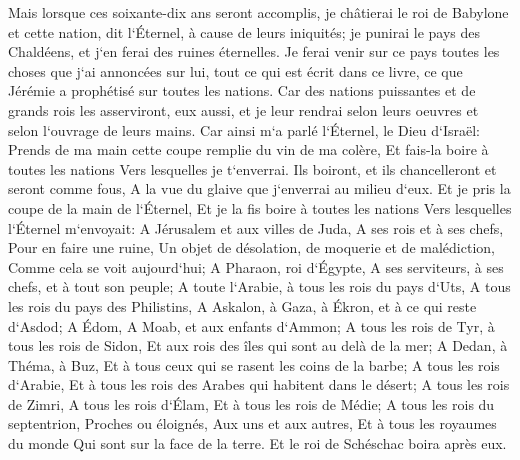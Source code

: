 \verse Mais lorsque ces soixante-dix ans seront accomplis, je châtierai le roi de Babylone et cette nation, dit l`Éternel, à cause de leurs iniquités; je punirai le pays des Chaldéens, et j`en ferai des ruines éternelles. 
\verse Je ferai venir sur ce pays toutes les choses que j`ai annoncées sur lui, tout ce qui est écrit dans ce livre, ce que Jérémie a prophétisé sur toutes les nations. 
\verse Car des nations puissantes et de grands rois les asserviront, eux aussi, et je leur rendrai selon leurs oeuvres et selon l`ouvrage de leurs mains. 
\verse Car ainsi m`a parlé l`Éternel, le Dieu d`Israël: Prends de ma main cette coupe remplie du vin de ma colère, Et fais-la boire à toutes les nations Vers lesquelles je t`enverrai. 
\verse Ils boiront, et ils chancelleront et seront comme fous, A la vue du glaive que j`enverrai au milieu d`eux. 
\verse Et je pris la coupe de la main de l`Éternel, Et je la fis boire à toutes les nations Vers lesquelles l`Éternel m`envoyait: 
\verse A Jérusalem et aux villes de Juda, A ses rois et à ses chefs, Pour en faire une ruine, Un objet de désolation, de moquerie et de malédiction, Comme cela se voit aujourd`hui; 
\verse A Pharaon, roi d`Égypte, A ses serviteurs, à ses chefs, et à tout son peuple; 
\verse A toute l`Arabie, à tous les rois du pays d`Uts, A tous les rois du pays des Philistins, A Askalon, à Gaza, à Ékron, et à ce qui reste d`Asdod; 
\verse A Édom, A Moab, et aux enfants d`Ammon; 
\verse A tous les rois de Tyr, à tous les rois de Sidon, Et aux rois des îles qui sont au delà de la mer; 
\verse A Dedan, à Théma, à Buz, Et à tous ceux qui se rasent les coins de la barbe; 
\verse A tous les rois d`Arabie, Et à tous les rois des Arabes qui habitent dans le désert; 
\verse A tous les rois de Zimri, A tous les rois d`Élam, Et à tous les rois de Médie; 
\verse A tous les rois du septentrion, Proches ou éloignés, Aux uns et aux autres, Et à tous les royaumes du monde Qui sont sur la face de la terre. Et le roi de Schéschac boira après eux. 
